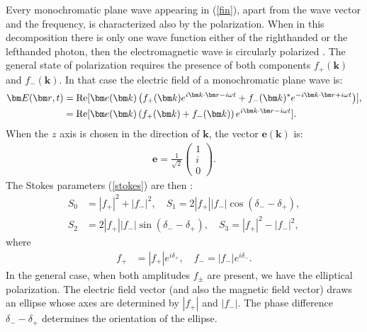\documentclass[onecolumn,aps,pra,12pt]{revtex4-1}
\begin{document}
Every monochromatic plane wave appearing in (\ref{fin}), apart from the wave vector and the frequency, is characterized also by the polarization. When in this decomposition there is only one wave function either of the righthanded or the lefthanded photon, then the electromagnetic wave is circularly polarized \cite{jackson}. The general state of polarization requires the presence of both components $f_+({\bm k})$ and $f_-({\bm k})$. In that case the electric field of a monochromatic plane wave is:
\begin{align}\label{el}
{\bm E}({\bm r},t)&={\rm{Re}}[{\bm e}({\bm k})\left(f_+({\bm k})e^{i\bm k\cdot\bm r-i\omega t}+f_-({\bm k})^*e^{-i\bm k\cdot\bm r+i\omega t}\right)],\nonumber\\
&={\rm{Re}}[{\bm e}({\bm k})\left(f_+({\bm k})+f_-({\bm k})\right)e^{i\bm k\cdot\bm r-i\omega t}].
\end{align}
When the $z$ axis is chosen in the direction of ${\bm k}$, the vector ${\bm e}({\bm k})$ is:
\begin{align}\label{pol,bbdh}
{\bm e}=\frac{1}{\sqrt{2}}\left(\begin{array}{c}1\\i\\0
\end{array}\right).
\end{align}
The Stokes  parameters (\ref{stokes}) are then \cite{jack,pol}:
\begin{align}\label{stokes1}
S_0&=|f_+|^2+|f_-|^2,\quad S_1=2|f_+||f_-|\cos(\delta_--\delta_+),\nonumber\\
S_2&=2|f_+||f_-|\sin(\delta_--\delta_+),\quad S_3=|f_+|^2-|f_-|^2,
\end{align}
where
\begin{align}\label{stokes2}
f_+&=|f_+|e^{i\delta_+},\quad f_-=|f_-| e^{i\delta_-}.
\end{align}
In the general case, when both amplitudes $f_\pm$ are present, we have the elliptical polarization. The electric field vector (and also the magnetic field vector) draws an ellipse whose axes are determined by $|f_+|$ and $|f_-|$. The phase difference $\delta_--\delta_+$ determines the orientation of the ellipse.
\end{document}
